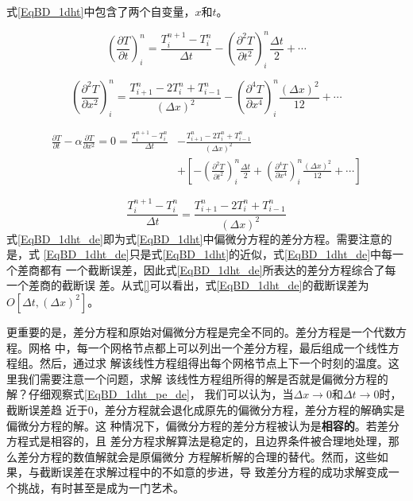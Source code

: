 式\eqref{EqBD_1dht}中包含了两个自变量，$x$和$t$。

\begin{equation}
  \left(
    \frac{\partial T}{\partial t}
  \right)_{i}^{n}
  =
  \frac{T_{i}^{n+1}-T_{i}^{n}}{\Delta t}
  -
  \left(
    \frac{\partial^{2} T}{\partial t^{2}}
  \right)_{i}^{n}
  \frac{\Delta t}{2}
  +
  \cdots
\end{equation}

\begin{equation}
  \left(
    \frac{\partial^{2} T}{\partial x^{2}}
  \right)_{i}^{n}
  =
  \frac{T_{i+1}^{n}-2T_{i}^{n}+T_{i-1}^{n}}{(\Delta x)^2}
  -
  \left(
    \frac{\partial^{4} T}{\partial x^{4}}
  \right)_{i}^{n}
  \frac{(\Delta x)^{2}}{12}
  +
  \cdots
\end{equation}

\begin{equation}
  \begin{aligned}
    \frac{\partial T}{\partial t}
    -
    \alpha
    \frac{\partial T}{\partial x^{2}}
    =
    0
    =
    \frac{T_{i}^{n+1}-T_{i}^{n}}{\Delta t}
    &-
    \frac{T_{i+1}^{n}-2T_{i}^{n}+T_{i-1}^{n}}{(\Delta x)^2}
    \\
    &+
    \left[
      -
      \left(
        \frac{\partial^{2} T}{\partial t^{2}}
      \right)_{i}^{n}
      \frac{\Delta t}{2}
      +
      \left(
        \frac{\partial^{4} T}{\partial x^{4}}
      \right)_{i}^{n}
      \frac{(\Delta x)^{2}}{12}
      +
      \cdots
    \right]
  \end{aligned}
  \label{EqBD_1dht_pede}
\end{equation}

\begin{equation}
    \frac{T_{i}^{n+1}-T_{i}^{n}}{\Delta t}
    =
    \frac{T_{i+1}^{n}-2T_{i}^{n}+T_{i-1}^{n}}{(\Delta x)^2}
    \label{EqBD_1dht_de}
\end{equation}
式\eqref{EqBD_1dht_de}即为式\eqref{EqBD_1dht}中偏微分方程的差分方程。需要注意的是，式
\eqref{EqBD_1dht_de}只是式\eqref{EqBD_1dht}的近似，式\eqref{EqBD_1dht_de}中每一个差商都有
一个截断误差，因此式\eqref{EqBD_1dht_de}所表达的差分方程综合了每一个差商的截断误
差。从式\eqref{}可以看出，式\eqref{EqBD_1dht_de}的截断误差为$O[\Delta t, (\Delta
x)^{2}]$。

更重要的是，差分方程和原始对偏微分方程是完全不同的。差分方程是一个代数方程。网格
中，每一个网格节点都上可以列出一个差分方程，最后组成一个线性方程组。然后，通过求
解该线性方程组得出每个网格节点上下一个时刻的温度。这里我们需要注意一个问题，求解
该线性方程组所得的解是否就是偏微分方程的解？仔细观察式\eqref{EqBD_1dht_pe_de}，
我们可以认为，当$\Delta x \rightarrow 0$和$\Delta t \rightarrow 0$时，截断误差趋
近于0，差分方程就会退化成原先的偏微分方程，差分方程的解确实是偏微分方程的解。这
种情况下，偏微分方程的差分方程被认为是\textbf{相容的}。若差分方程式是相容的，且
差分方程求解算法是稳定的，且边界条件被合理地处理，那么差分方程的数值解就会是原偏微分
方程解析解的合理的替代。然而，这些如果，与截断误差在求解过程中的不如意的步进，导
致差分方程的成功求解变成一个挑战，有时甚至是成为一门艺术。

